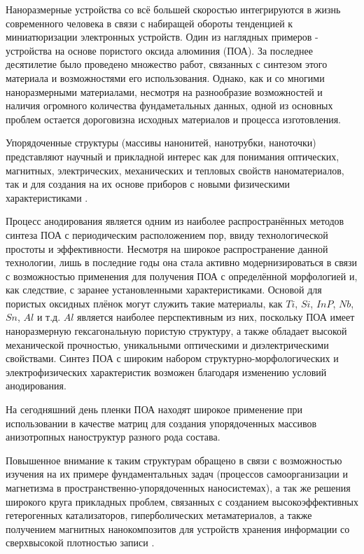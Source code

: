 
Наноразмерные устройства со всё большей скоростью интегрируются в жизнь современного человека в связи с набиращей обороты тенденцией к миниатюризации электронных устройств. Один из наглядных примеров - устройства на основе пористого оксида алюминия (ПОА). За последнее десятилетие было проведено множество работ, связанных с синтезом этого материала и возможностями его использования. Однако, как и со многими наноразмерными материалами, несмотря на разнообразие возможностей и наличия огромного количества фундаметальных данных, одной из основных проблем остается дороговизна исходных материалов и процесса изготовления.

Упорядоченные структуры (массивы нанонитей, нанотрубки, наноточки) представляют научный и прикладной интерес как для понимания оптических, магнитных, электрических, механических и тепловых свойств наноматериалов, так и для создания на их основе приборов с новыми физическими характеристиками \cite{belov-osobennosti}.

Процесс анодирования является одним из наиболее распространённых методов синтеза ПОА с периодическим расположением пор, ввиду технологической простоты и эффективности. 
Несмотря на широкое распространение данной технологии, лишь в последние годы она стала активно модернизироваться в связи с возможностью применения для получения ПОА с определённой морфологией и, как следствие, с заранее установленными характеристиками. Основой для пористых оксидных плёнок могут служить такие материалы, как $Ti$, $Si$, $InP$, $Nb$, $Sn$, $Al$ и т.д. $Al$ является наиболее перспективным из них, поскольку ПОА имеет наноразмерную гексагональную пористую структуру, а также обладает высокой механической прочностью, уникальными оптическими и диэлектрическими свойствами. Синтез ПОА с широким набором структурно-морфологических и электрофизических характеристик возможен благодаря изменению условий анодирования.

На сегодняшний день пленки ПОА находят широкое применение при использовании в качестве матриц для создания упорядоченных массивов анизотропных наноструктур разного рода состава.

Повышенное внимание к таким структурам обращено в связи с возможностью изучения на их примере фундаментальных задач (процессов самоорганизации и магнетизма в пространственно-упорядоченных наносистемах), а так же решения широкого круга прикладных проблем, связанных с созданием высокоэффективных гетерогенных катализаторов, гиперболических метаматериалов, а также получением магнитных нанокомпозитов для устройств хранения информации со сверхвысокой плотностью записи \cite{belov-osobennosti}.

\clearpage
